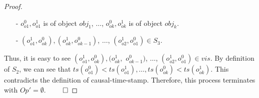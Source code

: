 {\begin {proof}
\begin{itemize}
\setlength{\itemsep}{0.5pt}
\item[-] $o^{0}_{\mathit{o1}}, o^{1}_{\mathit{o1}}$ is of object $\mathit{obj}_1$, $\ldots$, $o^{0}_{\mathit{ok}}, o^{1}_{\mathit{ok}}$ is of object $\mathit{obj}_k$.

\item[-] $(o^{1}_{\mathit{o1}},o^{0}_{\mathit{ok}}), (o^{1}_{\mathit{ok}},o^{0}_{\mathit{ok-1}})$, $\ldots$, $(o^{1}_{\mathit{o2}},o^{0}_{\mathit{o1}}) \in S_3$.
\end{itemize}

Thus, it is easy to see $(o^{1}_{\mathit{o1}},o^{0}_{\mathit{ok}}), (o^{1}_{\mathit{ok}},$ $o^{0}_{\mathit{ok-1}})$, $\ldots$, $(o^{1}_{\mathit{o2}},o^{0}_{\mathit{o1}}) \in \mathit{vis}$. By definition of $S_2$, we can see that $\mathit{ts}(o^{0}_{\mathit{o1}}) < \mathit{ts}(o^{1}_{\mathit{o1}}), \ldots, \mathit{ts}(o^{0}_{\mathit{ok}}) < \mathit{ts}(o^{1}_{\mathit{ok}})$. This contradicts the definition of causal-time-stamp. Therefore, this process terminates with $\mathit{Op}' = \emptyset$. $\qed$
\end {proof}
}
















